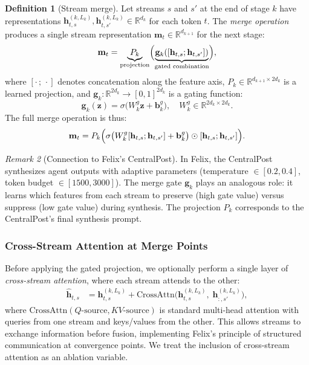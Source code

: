 \documentclass[11pt,a4paper]{article}
\theoremstyle{definition}
\newtheorem{definition}{Definition}[section]
\theoremstyle{plain}
\theoremstyle{remark}
\newtheorem{remark}[definition]{Remark}
\newcommand{\R}{\mathbb{R}}
\newcommand{\sigmoid}{\sigma}
\begin{document}
\begin{definition}[Stream merge]\label{def:merge}
Let streams $s$ and $s'$ at the end of stage $k$ have representations 
$\mathbf{h}_{t,s}^{(k, L_k)}, \mathbf{h}_{t,s'}^{(k, L_k)} \in 
\R^{d_k}$ for each token $t$. The \emph{merge operation} produces a single 
stream representation $\mathbf{m}_t \in \R^{d_{k+1}}$ for the next stage:
\begin{equation}\label{eq:merge}
  \mathbf{m}_t = \underbrace{P_{k}}_{\text{projection}} 
  \Bigl( 
    \underbrace{\mathbf{g}_{k}([\mathbf{h}_{t,s}; \mathbf{h}_{t,s'}])}_%
      {\text{gated combination}} 
  \Bigr),
\end{equation}
where $[\cdot\,;\,\cdot]$ denotes concatenation along the feature axis, 
$P_k \in \R^{d_{k+1} \times 2d_k}$ is a learned projection, and 
$\mathbf{g}_k: \R^{2d_k} \to [0,1]^{2d_k}$ is a gating function:
\begin{equation}\label{eq:gate}
  \mathbf{g}_k(\mathbf{z}) = \sigmoid\bigl(W_k^g \mathbf{z} + 
  \mathbf{b}_k^g\bigr), 
  \quad W_k^g \in \R^{2d_k \times 2d_k}.
\end{equation}
The full merge operation is thus:
\begin{equation}\label{eq:merge-full}
  \mathbf{m}_t = P_k \Bigl( \sigmoid\bigl(W_k^g 
  [\mathbf{h}_{t,s}; \mathbf{h}_{t,s'}] + \mathbf{b}_k^g\bigr) \odot 
  [\mathbf{h}_{t,s}; \mathbf{h}_{t,s'}] \Bigr).
\end{equation}
\end{definition}

\begin{remark}[Connection to Felix's CentralPost]
In Felix, the CentralPost synthesizes agent outputs with adaptive 
parameters (temperature $\in [0.2, 0.4]$, token budget $\in 
[1500, 3000]$). The merge gate $\mathbf{g}_k$ plays an analogous role: it 
learns which features from each stream to preserve (high gate value) versus 
suppress (low gate value) during synthesis. The projection $P_k$ 
corresponds to the CentralPost's final synthesis prompt.
\end{remark}

\subsubsection{Cross-Stream Attention at Merge Points}
\label{sec:cross-attn}

Before applying the gated projection, we optionally perform a single layer 
of \emph{cross-stream attention}, where each stream attends to the other:
\begin{align}
  \hat{\mathbf{h}}_{t,s} &= \mathbf{h}_{t,s}^{(k,L_k)} + 
    \text{CrossAttn}\bigl(\mathbf{h}_{t,s}^{(k,L_k)},\; 
    \mathbf{h}_{:,s'}^{(k,L_k)}\bigr), \label{eq:cross-attn}
\end{align}
where $\text{CrossAttn}(Q\text{-source}, KV\text{-source})$ is standard 
multi-head attention with queries from one stream and keys/values from the 
other. This allows streams to exchange information before fusion, 
implementing Felix's principle of structured communication at convergence 
points. We treat the inclusion of cross-stream attention as an ablation 
variable.
\end{document}
